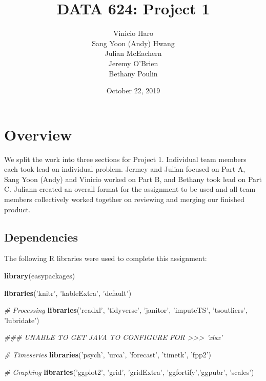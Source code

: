 \documentclass[openany]{book}
\title{DATA 624: Project 1}
\author{Vinicio Haro \\ Sang Yoon (Andy) Hwang \\ Julian McEachern \\ Jeremy O'Brien \\ Bethany Poulin}
\date{October 22, 2019}
\newenvironment{Shaded}{\begin{snugshade}}{\end{snugshade}}
\newcommand{\CommentTok}[1]{\textcolor[rgb]{0.56,0.35,0.01}{\textit{#1}}}
\newcommand{\KeywordTok}[1]{\textcolor[rgb]{0.13,0.29,0.53}{\textbf{#1}}}
\newcommand{\NormalTok}[1]{#1}
\newcommand{\StringTok}[1]{\textcolor[rgb]{0.31,0.60,0.02}{#1}}
\begin{document}
\maketitle

{
\setcounter{tocdepth}{1}
\tableofcontents
}
\hypertarget{overview}{%
\chapter*{Overview}\label{overview}}

We split the work into three sections for Project 1. Individual team
members each took lead on individual problem. Jermey and Julian focused
on Part A, Sang Yoon (Andy) and Vinicio worked on Part B, and Bethany
took lead on Part C. Juliann created an overall format for the
assignment to be used and all team members collectively worked together
on reviewing and merging our finished product.

\hypertarget{dependencies}{%
\section*{Dependencies}\label{dependencies}}

The following R libraries were used to complete this assignment:

\begin{Shaded}
\begin{Highlighting}[]
\KeywordTok{library}\NormalTok{(easypackages)}

\KeywordTok{libraries}\NormalTok{(}\StringTok{'knitr'}\NormalTok{, }\StringTok{'kableExtra'}\NormalTok{, }\StringTok{'default'}\NormalTok{)}

\CommentTok{# Processing}
\KeywordTok{libraries}\NormalTok{(}\StringTok{'readxl'}\NormalTok{, }\StringTok{'tidyverse'}\NormalTok{, }\StringTok{'janitor'}\NormalTok{, }\StringTok{'imputeTS'}\NormalTok{, }\StringTok{'tsoutliers'}\NormalTok{, }\StringTok{'lubridate'}\NormalTok{)}

\CommentTok{### UNABLE TO GET JAVA TO CONFIGURE FOR >>> 'xlsx'}

\CommentTok{# Timeseries }
\KeywordTok{libraries}\NormalTok{(}\StringTok{'psych'}\NormalTok{, }\StringTok{'urca'}\NormalTok{, }\StringTok{'forecast'}\NormalTok{, }\StringTok{'timetk'}\NormalTok{, }\StringTok{'fpp2'}\NormalTok{)}

\CommentTok{# Graphing}
\KeywordTok{libraries}\NormalTok{(}\StringTok{'ggplot2'}\NormalTok{, }\StringTok{'grid'}\NormalTok{, }\StringTok{'gridExtra'}\NormalTok{, }\StringTok{'ggfortify'}\NormalTok{,}\StringTok{'ggpubr'}\NormalTok{, }\StringTok{'scales'}\NormalTok{)}
\end{Highlighting}
\end{Shaded}
\end{document}
